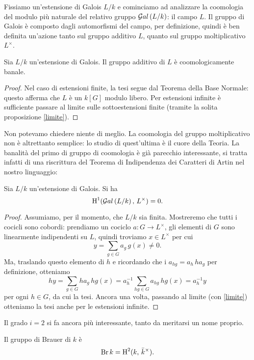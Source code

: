 Fissiamo un'estensione di Galois $ L/k $ e cominciamo ad analizzare la coomologia del modulo più naturale del relativo gruppo $ \mathcal{G}al\left( L/k \right) $: il campo $ L $. Il gruppo di Galois è composto dagli automorfismi del campo, per definizione, quindi è ben definita un'azione tanto sul gruppo additivo $ L $, quanto sul gruppo moltiplicativo $ L^\times $.

\begin{theorem} \label{Hadd}
	Sia $ L / k $ un'estensione di Galois. Il gruppo additivo di $ L $ è coomologicamente banale.
\end{theorem}
\begin{proof}
	Nel caso di estensioni finite, la tesi segue dal Teorema della Base Normale: questo afferma che $ L $ è un $ k[G] $ modulo libero. Per estensioni infinite è sufficiente passare al limite sulle sottoestensioni finite (tramite la solita proposizione \ref{limite}).
\end{proof}

Non potevamo chiedere niente di meglio. La coomologia del gruppo moltiplicativo non è altrettanto semplice: lo studio di quest'ultima è il cuore della Teoria. La banalità del primo di gruppo di coomologia è già parecchio interessante, si tratta infatti di una riscrittura del Teorema di Indipendenza dei Caratteri di Artin nel nostro linguaggio:

\begin{theorem}[Hilbert 90]\label{H90}
	Sia $ L/k $ un'estensione di Galois. Si ha
	\[ \operatorname{H}^1(\mathcal{G}al\left(  L / k \right), \, L^\times) = 0. \]
\end{theorem}
\begin{proof}
	Assumiamo, per il momento, che $ L/k $ sia finita. Mostreremo che tutti i cocicli sono cobordi: prendiamo un cociclo $ a \colon G \to L^\times $, gli elementi di $ G $ sono linearmente indipendenti su $ L $, quindi troviamo $ x \in L^\times $ per cui
	\[ y = \sum_{g \in G} a_g \, g(x) \neq 0. \]
	Ma, traslando questo elemento di $ h $ e ricordando che i $ a_{hg} = a_h \, ha_g $ per definizione, otteniamo $$  hy = \sum_{g \in G} ha_g  \, hg(x)  = a_h^{-1} \sum_{hg \in G} a_{hg} \,  hg(x) = a_h^{-1}y  $$ per ogni $ h \in G $, da cui la tesi.
	Ancora una volta, passando al limite (con \ref{limite}) otteniamo la tesi anche per le estensioni infinite.
\end{proof}

Il grado $ i = 2 $ si fa ancora più interessante, tanto da meritarsi un nome proprio.
\begin{definition}
	Il gruppo di Brauer di $ k $ è $$  \operatorname{Br} k = \operatorname{H}^2(k, \, \bar{k}^\times).  $$
\end{definition}

